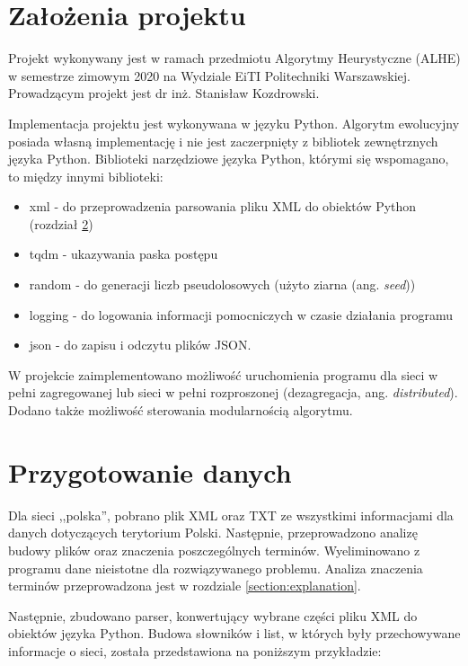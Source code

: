 \section{Założenia projektu}

Projekt wykonywany jest w ramach przedmiotu Algorytmy Heurystyczne (ALHE) w semestrze zimowym 2020 na Wydziale EiTI Politechniki Warszawskiej. Prowadzącym projekt jest dr inż. Stanisław Kozdrowski.

Implementacja projektu jest wykonywana w języku Python. Algorytm ewolucyjny posiada własną implementację i nie jest zaczerpnięty z bibliotek zewnętrznych języka Python. Biblioteki narzędziowe języka Python, którymi się wspomagano, to między innymi biblioteki:
\begin{itemize}
    \item xml - do przeprowadzenia parsowania pliku XML do obiektów Python (rozdział \ref{section:preparing})
    \item tqdm - ukazywania paska postępu
    \item random - do generacji liczb pseudolosowych (użyto ziarna (ang. \textit{seed}))
    \item logging - do logowania informacji pomocniczych w czasie działania programu
    \item json - do zapisu i odczytu plików JSON.
\end{itemize}

W projekcie zaimplementowano możliwość uruchomienia programu dla sieci w pełni zagregowanej lub sieci w pełni rozproszonej (dezagregacja, ang. \textit{distributed}). Dodano także możliwość sterowania modularnością algorytmu.

\section{Przygotowanie danych}
\label{section:preparing}

Dla sieci ,,polska'', pobrano plik XML oraz TXT ze wszystkimi informacjami dla danych dotyczących terytorium Polski. Następnie, przeprowadzono analizę budowy plików oraz znaczenia poszczególnych terminów. Wyeliminowano z programu dane nieistotne dla rozwiązywanego problemu. Analiza znaczenia terminów przeprowadzona jest w rozdziale \ref{section:explanation}.

Następnie, zbudowano parser, konwertujący wybrane części pliku XML do obiektów języka Python. Budowa słowników i list, w których były przechowywane informacje o sieci, została przedstawiona na poniższym przykładzie:


